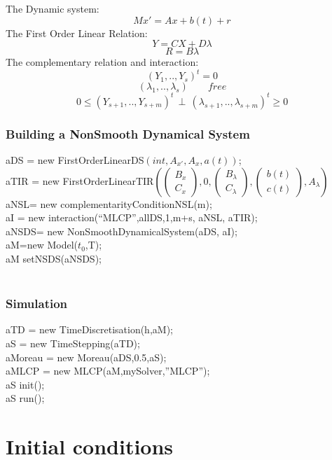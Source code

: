 The Dynamic system:
\[Mx'=Ax +b(t)+r\]
The First Order Linear Relation:
\[Y=CX +D \lambda\]
\[R=B \lambda\]
The complementary relation and interaction:
\[(Y_{1},..,Y_{s})^{t}=0\]
\[(\lambda_{1},..,\lambda_{s}) \qquad free\]
\[0 \leq (Y_{s+1},..,Y_{s+m})^{t} \, \perp \, (\lambda_{s+1},..,\lambda_{s+m})^{t} \geq 0\]

\subsubsection{Building a NonSmooth Dynamical System}
 
 aDS = new FirstOrderLinearDS$(int,A_{x'},A_{x},a(t))$;\\
 aTIR = new FirstOrderLinearTIR$(\left(\begin{array}{c}B_{x}\\C_{x}
 \end{array}\right),0,\left(\begin{array}{c}B_{\lambda}\\C_{\lambda}
 \end{array}\right),\left(\begin{array}{c}b(t)\\c(t) \end{array}\right),A_{\lambda})$\\

 aNSL= new complementarityConditionNSL(m);\\
 aI = new interaction(``MLCP'',allDS,1,m+s, aNSL, aTIR);\\
 aNSDS= new NonSmoothDynamicalSystem(aDS, aI);\\
 aM=new Model($t_{0}$,T);\\
 aM setNSDS(aNSDS);\\
\\
\subsubsection{Simulation}
aTD = new TimeDiscretisation(h,aM);\\
aS = new TimeStepping(aTD);\\
aMoreau = new Moreau(aDS,0.5,aS);\\
aMLCP = new MLCP(aM,mySolver,''MLCP'');\\
aS init();\\
aS run();\\

\section{Initial conditions}
